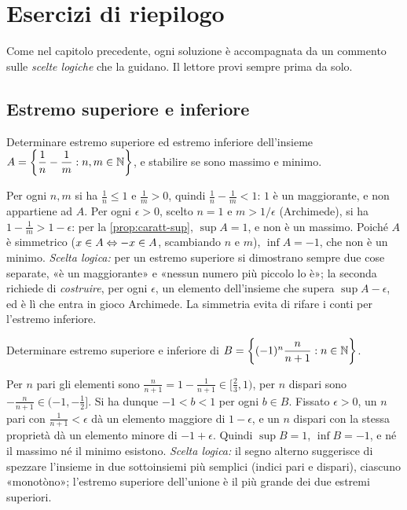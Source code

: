 \section{Esercizi di riepilogo}
\label{sec:esercizi-cap2}

Come nel capitolo precedente, ogni soluzione è accompagnata da un commento sulle
\emph{scelte logiche} che la guidano. Il lettore provi sempre prima da solo.

\subsection*{Estremo superiore e inferiore}

\begin{esercizio}\label{es:sup-differenze}
Determinare estremo superiore ed estremo inferiore dell'insieme
$A=\left\{ \dfrac1n-\dfrac1m : n,m\in\mathbb{N} \right\}$, e stabilire se sono massimo e minimo.
\begin{soluzione}
Per ogni $n,m$ si ha $\frac1n\le1$ e $\frac1m>0$, quindi $\frac1n-\frac1m<1$: $1$ è un
maggiorante, e non appartiene ad $A$. Per ogni $\epsilon>0$, scelto $n=1$ e $m>1/\epsilon$
(Archimede), si ha $1-\frac1m>1-\epsilon$: per la \cref{prop:caratt-sup}, $\sup A=1$, e
non è un massimo. Poiché $A$ è simmetrico ($x\in A\Leftrightarrow-x\in A$, scambiando $n$ e $m$),
$\inf A=-1$, che non è un minimo. \emph{Scelta logica:} per un estremo superiore si
dimostrano sempre due cose separate, «è un maggiorante» e «nessun numero più piccolo lo
è»; la seconda richiede di \emph{costruire}, per ogni $\epsilon$, un elemento
dell'insieme che supera $\sup A-\epsilon$, ed è lì che entra in gioco Archimede. La
simmetria evita di rifare i conti per l'estremo inferiore.
\end{soluzione}
\end{esercizio}

\begin{esercizio}
Determinare estremo superiore e inferiore di $B=\left\{ (-1)^{n}\dfrac{n}{n+1} : n\in\mathbb{N} \right\}$.
\begin{soluzione}
Per $n$ pari gli elementi sono $\frac{n}{n+1}=1-\frac{1}{n+1}\in[\frac23,1)$, per $n$
dispari sono $-\frac{n}{n+1}\in(-1,-\frac12]$. Si ha dunque $-1<b<1$ per ogni $b\in B$.
Fissato $\epsilon>0$, un $n$ pari con $\frac{1}{n+1}<\epsilon$ dà un elemento maggiore di
$1-\epsilon$, e un $n$ dispari con la stessa proprietà dà un elemento minore di
$-1+\epsilon$. Quindi $\sup B=1$, $\inf B=-1$, e né il massimo né il minimo esistono.
\emph{Scelta logica:} il segno alterno suggerisce di spezzare l'insieme in due
sottoinsiemi più semplici (indici pari e dispari), ciascuno «monotòno»; l'estremo
superiore dell'unione è il più grande dei due estremi superiori.
\end{soluzione}
\end{esercizio}

